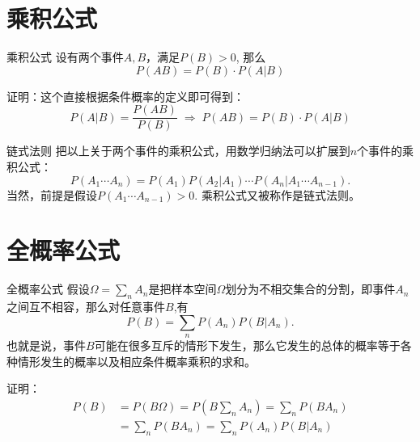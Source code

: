 \documentclass[10pt]{beamer}
\begin{document}
\section{乘积公式}


\begin{frame}

\begin{block}{乘积公式}
设有两个事件$A,B$，满足$P(B) > 0$, 那么
$$P(AB) = P(B)\cdot P(A|B)$$

\pause

证明：这个直接根据条件概率的定义即可得到：
$$P(A|B) = \dfrac{P(AB)}{P(B)} \; \Longrightarrow \; P(AB) = P(B)\cdot P(A|B)$$
\end{block}

\end{frame}


\begin{frame}

\begin{block}{链式法则}
把以上关于两个事件的乘积公式，用数学归纳法可以扩展到$n$个事件的乘积公式：
$$P(A_1\cdots A_n) = P(A_1)P(A_2|A_1)\cdots P(A_n|A_1\cdots A_{n-1}).$$
当然，前提是假设$P(A_1\cdots A_{n-1}) > 0.$ 乘积公式又被称作是链式法则。
\end{block}

\end{frame}


\section{全概率公式}


\begin{frame}

\begin{block}{全概率公式}
假设$\Omega = \sum\limits_n A_n$是把样本空间$\Omega$划分为不相交集合的分割，即事件$A_n$之间互不相容，那么对任意事件$B$,有
$$P(B) = \sum\limits_n P(A_n)P(B|A_n).$$ \pause
也就是说，事件$B$可能在很多互斥的情形下发生，那么它发生的总体的概率等于各种情形发生的概率以及相应条件概率乘积的求和。
\end{block}

\vspace{1em}
\pause

证明：
\begin{align*}
P(B) & = P(B\Omega) = P(B\sum\limits_n A_n) = \sum\limits_n P(BA_n) \\
& = \sum\limits_n P(BA_n) = \sum\limits_n P(A_n)P(B|A_n)
\end{align*}
\end{frame}
\end{document}
